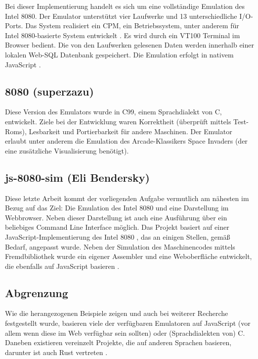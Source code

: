 Bei dieser Implementierung handelt es sich um eine vollständige Emulation des Intel 8080. Der Emulator unterstützt vier Laufwerke und 13 unterschiedliche I/O-Ports. Das System realisiert ein \ac{CPM}, ein Betriebssystem, unter anderem für Intel 8080-basierte System entwickelt \cite{cpm}. Es wird durch ein VT100 Terminal im Browser bedient. Die von den Laufwerken gelesenen Daten werden innerhalb einer lokalen Web-SQL Datenbank gespeichert. Die Emulation erfolgt in nativem JavaScript \cite{intelTramm}.

\subsection{8080 (superzazu)}

Diese Version des Emulators wurde in C99, einem Sprachdialekt von C, entwickelt. Ziele bei der Entwicklung waren Korrektheit (überprüft mittels Test-Roms), Lesbarkeit und Portierbarkeit für andere Maschinen. Der Emulator erlaubt unter anderem die Emulation des Arcade-Klassikers \glqq Space Invaders\grqq{} (der eine zusätzliche Visualisierung benötigt)\cite{intelSuper, spaceSuper}.

\subsection{js-8080-sim (Eli Bendersky)}

Diese letzte Arbeit kommt der vorliegenden Aufgabe vermutlich am nähesten im Bezug auf das Ziel: Die Emulation des Intel 8080 und eine Darstellung im Webbrowser. Neben dieser Darstellung ist auch eine Ausführung über ein beliebiges Command Line Interface möglich. Das Projekt basiert auf einer JavaScript-Implementierung des Intel 8080 \cite{8080js}, das an einigen Stellen, gemäß Bedarf, angepasst wurde. Neben der Simulation des Maschinencodes mittels Fremdbibliothek wurde ein eigener Assembler und eine Weboberfläche entwickelt, die ebenfalls auf JavaScript basieren \cite{intelEli}.

\subsection{Abgrenzung}

Wie die herangezogenen Beispiele zeigen und auch bei weiterer Recherche festgestellt wurde, basieren viele der verfügbaren Emulatoren auf JavaScript (vor allem wenn diese im Web verfügbar sein sollten) oder (Sprachdialekten von) C. Daneben existieren vereinzelt Projekte, die auf anderen Sprachen basieren, darunter ist auch Rust vertreten \cite{intelRust}.

